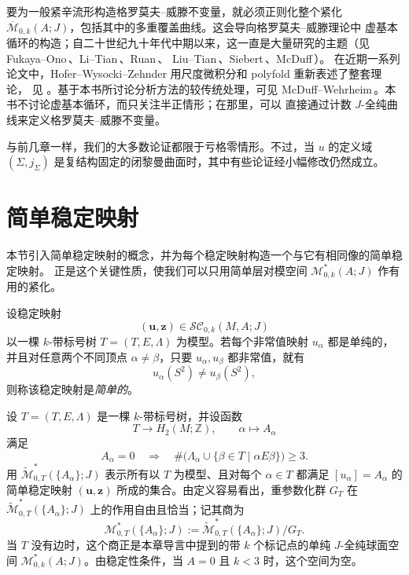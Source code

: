 要为一般紧辛流形构造格罗莫夫--威滕不变量，就必须正则化整个紧化
$\overline{\mathcal M}_{0,k}(A;J)$，包括其中的多重覆盖曲线。这会导向格罗莫夫--威滕理论中
虚基本循环的构造；自二十世纪九十年代中期以来，这一直是大量研究的主题（见
Fukaya--Ono\,、Li--Tian\,、Ruan\,、
Liu--Tian\,、Siebert\,、McDuff\,）。
在近期一系列论文中，Hofer--Wysocki--Zehnder 用尺度微积分和 polyfold 重新表述了整套理论，
见 。基于本书所讨论分析方法的较传统处理，可见
McDuff--Wehrheim\,。本书不讨论虚基本循环，而只关注半正情形；在那里，可以
直接通过计数 $J$-全纯曲线来定义格罗莫夫--威滕不变量。

与前几章一样，我们的大多数论证都限于亏格零情形。不过，当 $u$ 的定义域
$(\Sigma,j_\Sigma)$ 是复结构固定的闭黎曼曲面时，其中有些论证经小幅修改仍然成立。

\section{简单稳定映射}\label{sec:6-1}

本节引入简单稳定映射的概念，并为每个稳定映射构造一个与它有相同像的简单稳定映射。
正是这个关键性质，使我们可以只用简单层对模空间 $\mathcal M^*_{0,k}(A;J)$ 作有用的紧化。

\begin{definition}\label{def:6-1-1}
设稳定映射
\[
  (\mathbf u,\mathbf z)\in\mathcal{SC}_{0,k}(M,A;J)
\]
以一棵 $k$-带标号树 $T=(T,E,\Lambda)$ 为模型。若每个非常值映射 $u_\alpha$ 都是单纯的，
并且对任意两个不同顶点 $\alpha\ne\beta$，只要 $u_\alpha,u_\beta$ 都非常值，就有
\[
  u_\alpha(S^2)\ne u_\beta(S^2),
\]
则称该稳定映射是\emph{简单的}。
\end{definition}

设 $T=(T,E,\Lambda)$ 是一棵 $k$-带标号树，并设函数
\[
  T\longrightarrow H_2(M;\mathbb Z),
  \qquad \alpha\longmapsto A_\alpha
\]
满足
\begin{equation}\label{eq:6-1-1}
  A_\alpha=0
  \quad\Longrightarrow\quad
  \#\bigl(\Lambda_\alpha\cup\{\beta\in T\mid\alpha E\beta\}\bigr)\ge3.
\end{equation}
用 $\widetilde{\mathcal M}^*_{0,T}(\{A_\alpha\};J)$ 表示所有以 $T$ 为模型、且对每个
$\alpha\in T$ 都满足 $[u_\alpha]=A_\alpha$ 的简单稳定映射
$(\mathbf u,\mathbf z)$ 所成的集合。由定义容易看出，重参数化群 $G_T$ 在
$\widetilde{\mathcal M}^*_{0,T}(\{A_\alpha\};J)$ 上的作用自由且恰当；记其商为
\[
  \mathcal M^*_{0,T}(\{A_\alpha\};J)
  :=\widetilde{\mathcal M}^*_{0,T}(\{A_\alpha\};J)/G_T.
\]
当 $T$ 没有边时，这个商正是本章导言中提到的带 $k$ 个标记点的单纯 $J$-全纯球面空间
$\mathcal M^*_{0,k}(A;J)$。由稳定性条件，当 $A=0$ 且 $k<3$ 时，这个空间为空。

